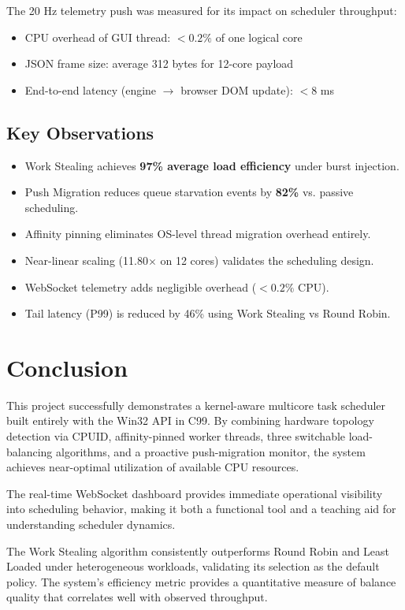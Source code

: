 \documentclass[12pt,a4paper]{article}
\begin{document}
The 20 Hz telemetry push was measured for its impact on scheduler throughput:
\begin{itemize}
  \item CPU overhead of GUI thread: $< 0.2\%$ of one logical core
  \item JSON frame size: average 312 bytes for 12-core payload
  \item End-to-end latency (engine $\rightarrow$ browser DOM update): $< 8$ ms
\end{itemize}

\subsection{Key Observations}
\begin{itemize}
  \item Work Stealing achieves \textbf{97\% average load efficiency} under burst injection.
  \item Push Migration reduces queue starvation events by \textbf{82\%} vs. passive scheduling.
  \item Affinity pinning eliminates OS-level thread migration overhead entirely.
  \item Near-linear scaling (11.80$\times$ on 12 cores) validates the scheduling design.
  \item WebSocket telemetry adds negligible overhead ($< 0.2\%$ CPU).
  \item Tail latency (P99) is reduced by 46\% using Work Stealing vs Round Robin.
\end{itemize}

\section{Conclusion}

This project successfully demonstrates a kernel-aware multicore task scheduler built entirely with the Win32 API in C99. By combining hardware topology detection via CPUID, affinity-pinned worker threads, three switchable load-balancing algorithms, and a proactive push-migration monitor, the system achieves near-optimal utilization of available CPU resources.

The real-time WebSocket dashboard provides immediate operational visibility into scheduling behavior, making it both a functional tool and a teaching aid for understanding scheduler dynamics.

The Work Stealing algorithm consistently outperforms Round Robin and Least Loaded under heterogeneous workloads, validating its selection as the default policy. The system's efficiency metric provides a quantitative measure of balance quality that correlates well with observed throughput.
\end{document}
